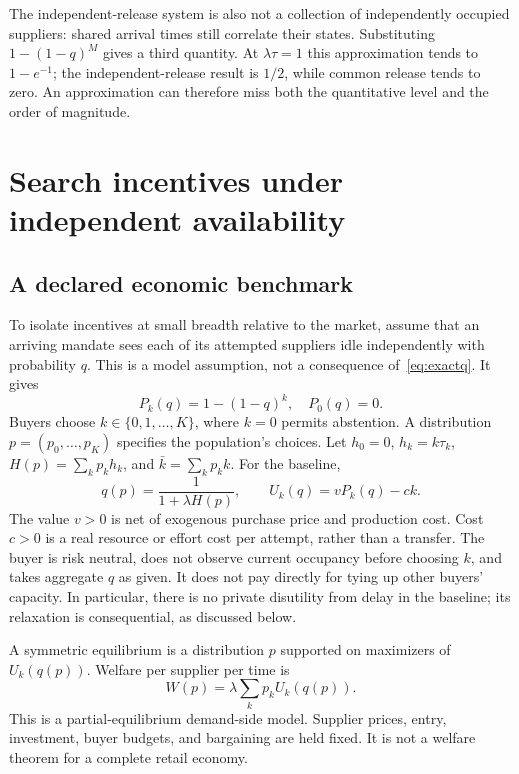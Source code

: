\documentclass[11pt,a4paper]{article}
\begin{document}
The independent-release system is also not a collection of independently occupied suppliers: shared arrival times still correlate their states. Substituting $1-(1-q)^M$ gives a third quantity. At $\lambda\tau=1$ this approximation tends to $1-e^{-1}$; the independent-release result is $1/2$, while common release tends to zero. An approximation can therefore miss both the quantitative level and the order of magnitude.

\section{Search incentives under independent availability}
\subsection{A declared economic benchmark}
To isolate incentives at small breadth relative to the market, assume that an arriving mandate sees each of its attempted suppliers idle independently with probability $q$. This is a model assumption, not a consequence of~\eqref{eq:exactq}. It gives
\begin{equation}
 P_k(q)=1-(1-q)^k,\quad P_0(q)=0.\label{eq:ind}
\end{equation}
Buyers choose $k\in\{0,1,\ldots,K\}$, where $k=0$ permits abstention. A distribution $p=(p_0,\ldots,p_K)$ specifies the population's choices. Let $h_0=0$, $h_k=k\tau_k$, $H(p)=\sum_k p_kh_k$, and $\bar k=\sum_kp_kk$. For the baseline,
\begin{equation}
 q(p)=\frac{1}{1+\lambda H(p)},\qquad
 U_k(q)=vP_k(q)-ck.\label{eq:utility}
\end{equation}
The value $v>0$ is net of exogenous purchase price and production cost. Cost $c>0$ is a real resource or effort cost per attempt, rather than a transfer. The buyer is risk neutral, does not observe current occupancy before choosing $k$, and takes aggregate $q$ as given. It does not pay directly for tying up other buyers' capacity. In particular, there is no private disutility from delay in the baseline; its relaxation is consequential, as discussed below.

A symmetric equilibrium is a distribution $p$ supported on maximizers of $U_k(q(p))$. Welfare per supplier per time is
\begin{equation}
 W(p)=\lambda\sum_kp_kU_k(q(p)).\label{eq:welfare}
\end{equation}
This is a partial-equilibrium demand-side model. Supplier prices, entry, investment, buyer budgets, and bargaining are held fixed. It is not a welfare theorem for a complete retail economy.
\end{document}

